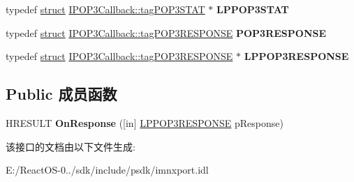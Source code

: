 \begin{DoxyCompactItemize}
typedef \hyperlink{interfacestruct}{struct} \hyperlink{struct_i_p_o_p3_callback_1_1tag_p_o_p3_s_t_a_t}{I\+P\+O\+P3\+Callback\+::tag\+P\+O\+P3\+S\+T\+AT} $\ast$ {\bfseries L\+P\+P\+O\+P3\+S\+T\+AT}
\item 
\mbox{\label{interface_i_p_o_p3_callback_a78f8455f54a7f2c5d2388215adfcecaf}} 
typedef \hyperlink{interfacestruct}{struct} \hyperlink{struct_i_p_o_p3_callback_1_1tag_p_o_p3_r_e_s_p_o_n_s_e}{I\+P\+O\+P3\+Callback\+::tag\+P\+O\+P3\+R\+E\+S\+P\+O\+N\+SE} {\bfseries P\+O\+P3\+R\+E\+S\+P\+O\+N\+SE}
\item 
\mbox{\label{interface_i_p_o_p3_callback_a4f412ed809efe3caaad661d52fdab36f}} 
typedef \hyperlink{interfacestruct}{struct} \hyperlink{struct_i_p_o_p3_callback_1_1tag_p_o_p3_r_e_s_p_o_n_s_e}{I\+P\+O\+P3\+Callback\+::tag\+P\+O\+P3\+R\+E\+S\+P\+O\+N\+SE} $\ast$ {\bfseries L\+P\+P\+O\+P3\+R\+E\+S\+P\+O\+N\+SE}
\end{DoxyCompactItemize}
\subsection*{Public 成员函数}
\begin{DoxyCompactItemize}
\item 
\mbox{\label{interface_i_p_o_p3_callback_acc82b7a61d5504a2a76bafef8387b9d1}} 
H\+R\+E\+S\+U\+LT {\bfseries On\+Response} (\mbox{[}in\mbox{]} \hyperlink{struct_i_p_o_p3_callback_1_1tag_p_o_p3_r_e_s_p_o_n_s_e}{L\+P\+P\+O\+P3\+R\+E\+S\+P\+O\+N\+SE} p\+Response)
\end{DoxyCompactItemize}


该接口的文档由以下文件生成\+:\begin{DoxyCompactItemize}
\item 
E\+:/\+React\+O\+S-\/0../sdk/include/psdk/imnxport.\+idl\end{DoxyCompactItemize}
